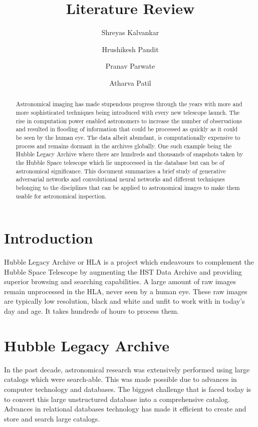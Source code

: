 \documentclass[12pt, letterpaper]{article}
\title{Literature Review}
\author{Shreyas Kalvankar \and Hrushikesh Pandit \and Pranav Parwate \and Atharva Patil}
\begin{document}
	\maketitle

	\begin{abstract}
		Astronomical imaging has made stupendous progress through the years with more and more sophisticated techniques being introduced with every new telescope launch. The rise in computation power enabled astronomers to increase the number of observations and resulted in flooding of information that could be processed as quickly as it could be seen by the human eye. The data albeit abundant, is computationally expensive to process and remains dormant in the archives globally. One such example being the Hubble Legacy Archive where there are hundreds and thousands of snapshots taken by the Hubble Space telescope which lie unprocessed in the database but can be of astronomical significance. This document summarizes a brief study of generative adversarial networks and convolutional neural networks and different techniques belonging to the disciplines that can be applied to astronomical images to make them usable for astronomical inspection.
	\end{abstract}

	\section{Introduction}
		\hspace*{0.25 in}Hubble Legacy Archive or HLA is a project which endeavours to complement the Hubble Space Telescope by augmenting the HST Data Archive and providing superior browsing and searching capabilities. A large amount of raw images remain unprocessed in the HLA, never seen by a human eye. These raw images are typically low resolution, black and white and unfit to work with in today's day and age. It takes hundreds of hours to process them.
	\section{Hubble Legacy Archive}
		\hspace*{0.25 in}In the past decade, astronomical research was extensively performed using large catalogs which were search-able. This was made possible due to advances in computer technology and databases. The biggest challenge that is faced today is to convert this  large unstructured database into a comprehensive catalog. Advances in relational databases technology has made it efficient to create and store and search large catalogs.
\end{document}
